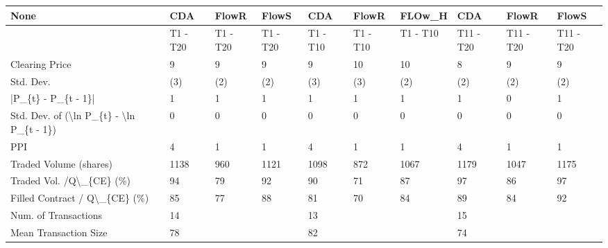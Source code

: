 \begin{tabular}{llllllllll}
\hline
 None                                                      & CDA      & FlowR    & FlowS    & CDA      & FlowR    & FLOw\_H   & CDA       & FlowR     & FlowS     \\
\hline
                                                           & T1 - T20 & T1 - T20 & T1 - T20 & T1 - T10 & T1 - T10 & T1 - T10 & T11 - T20 & T11 - T20 & T11 - T20 \\
 Clearing Price                                            & 9        & 9        & 9        & 9        & 10       & 10       & 8         & 9         & 9         \\
 Std. Dev.                                                 & (3)      & (2)      & (2)      & (3)      & (3)      & (2)      & (2)       & (2)       & (2)       \\
 |P\_\{t\} - P\_\{t - 1\}|                                       & 1        & 1        & 1        & 1        & 1        & 1        & 1         & 0         & 1         \\
 Std. Dev. of (\textbackslash{}ln P\_\{t\} - \textbackslash{}ln P\_\{t - 1\})                  & 0        & 0        & 0        & 0        & 0        & 0        & 0         & 0         & 0         \\
 PPI                                                       & 4        & 1        & 1        & 4        & 1        & 1        & 4         & 1         & 1         \\
 Traded Volume (shares)                                    & 1138     & 960      & 1121     & 1098     & 872      & 1067     & 1179      & 1047      & 1175      \\
 Traded Vol. /Q\textbackslash{}\_\{CE\} (\%)                                  & 94       & 79       & 92       & 90       & 71       & 87       & 97        & 86        & 97        \\
 Filled Contract / Q\textbackslash{}\_\{CE\} (\%)                             & 85       & 77       & 88       & 81       & 70       & 84       & 89        & 84        & 92        \\
 Num. of Transactions                                      & 14       &          &          & 13       &          &          & 15        &           &           \\
 Mean Transaction Size                                     & 78       &          &          & 82       &          &          & 74        &           &           \\

\end{tabular}

